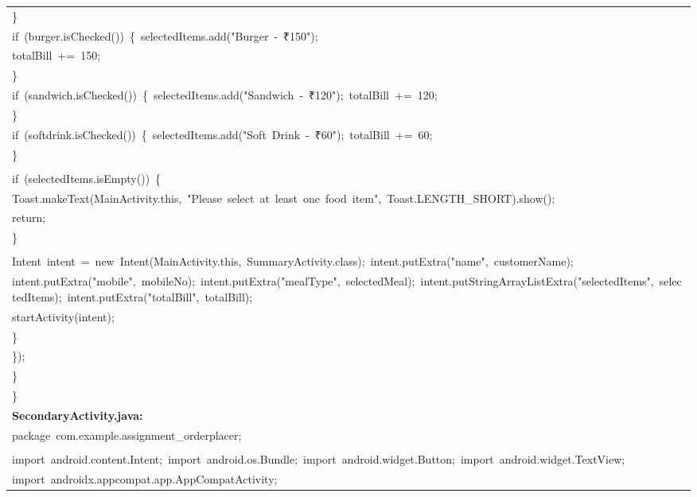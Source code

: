 \documentclass[a4paper,12pt]{article}
\begin{document}
\begin{longtable}{|p{}|}
{\ttfamily\small \}} \\
{\ttfamily\small if\ (burger.isChecked())\ \{\ selectedItems.add("Burger\ -\ ₹150");} \\
{\ttfamily\small totalBill\ +=\ 150;} \\
{\ttfamily\small \}} \\
{\ttfamily\small if\ (sandwich.isChecked())\ \{\ selectedItems.add("Sandwich\ -\ ₹120");\ totalBill\ +=\ 120;} \\
{\ttfamily\small \}} \\
{\ttfamily\small if\ (softdrink.isChecked())\ \{\ selectedItems.add("Soft\ Drink\ -\ ₹60");\ totalBill\ +=\ 60;} \\
{\ttfamily\small \}} \\
\strut \\
{\ttfamily\small if\ (selectedItems.isEmpty())\ \{} \\
{\ttfamily\small Toast.makeText(MainActivity.this,\ "Please\ select\ at\ least\ one\ food\ item",\ Toast.LENGTH\_SHORT).show();} \\
{\ttfamily\small return;} \\
{\ttfamily\small \}} \\
\strut \\
{\ttfamily\small Intent\ intent\ =\ new\ Intent(MainActivity.this,\ SummaryActivity.class);\ intent.putExtra("name",\ customerName);} \\
{\ttfamily\small intent.putExtra("mobile",\ mobileNo);\ intent.putExtra("mealType",\ selectedMeal);\ intent.putStringArrayListExtra("selectedItems",\ selectedItems);\ intent.putExtra("totalBill",\ totalBill);} \\
{\ttfamily\small startActivity(intent);} \\
{\ttfamily\small \}} \\
{\ttfamily\small \});} \\
{\ttfamily\small \}} \\
{\ttfamily\small \}} \\
\hline
\rule{0pt}{13pt}\textbf{SecondaryActivity.java:} \\
\hline
{\ttfamily\small package\ com.example.assignment\_orderplacer;} \\
\strut \\
{\ttfamily\small import\ android.content.Intent;\ import\ android.os.Bundle;\ import\ android.widget.Button;\ import\ android.widget.TextView;} \\
{\ttfamily\small import\ androidx.appcompat.app.AppCompatActivity;} \\

\end{longtable}
\end{document}
